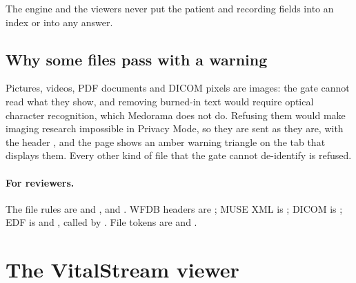 The engine and the viewers never put the patient and recording fields into an index or into any
answer.

\subsection{Why some files pass with a warning}
\label{sec:protecting-warning}

Pictures, videos, PDF documents and DICOM pixels are images: the gate cannot read what they show,
and removing burned-in text would require optical character recognition, which Medorama does not
do. Refusing them would make imaging research impossible in Privacy Mode, so they are sent as they
are, with the header , and the page shows an amber warning
triangle on the tab that displays them. Every other kind of file that the gate cannot de-identify
is refused.

\paragraph{For reviewers.} The file rules are   and
, and  . WFDB headers are
 ; MUSE XML is  ; DICOM is
; EDF is   and , called by
 . File tokens are   and
.

\section{The VitalStream viewer}
\label{sec:protecting-vitalstream}

